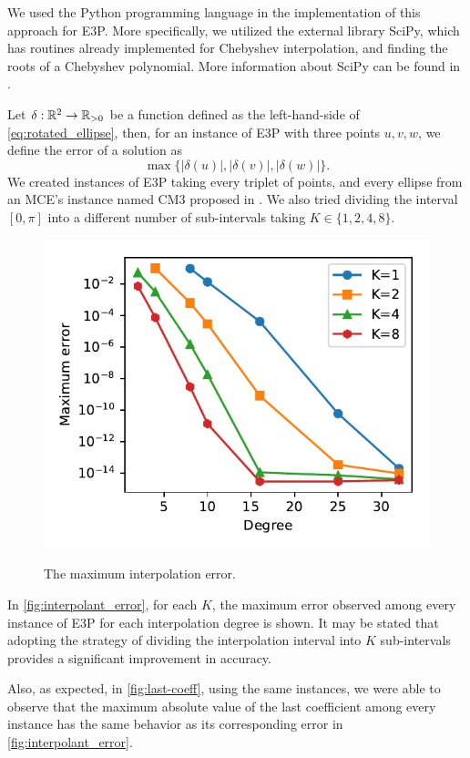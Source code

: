 We used the Python programming language in the implementation of this approach for E3P. More specifically, we utilized the external library SciPy, which has routines already implemented for Chebyshev interpolation, and finding the roots of a Chebyshev polynomial. More information about SciPy can be found in \cite{scipy}.
 
Let $\delta : \mathbb{R}^2 \to \mathbb{R}_{>0}$ be a function defined as the left-hand-side of \autoref{eq:rotated_ellipse}, then, for an instance of E3P with three points $u, v, w$, we define the error of a solution as $$\max\{|\delta(u)|, |\delta(v)|, |\delta(w)| \}.$$
We created instances of E3P taking every triplet of points, and every ellipse from an MCE's instance named CM3 proposed in . We also tried dividing the interval $[0, \pi]$ into a different number of sub-intervals taking $K \in\{1, 2, 4, 8\}$.

\begin{figure}
	\centering
	\caption{The maximum interpolation error.}
	\includegraphics[scale=.9]{tex/figures/error_roots}
	\fautor
	\label{fig:interpolant_error}
\end{figure}

In \autoref{fig:interpolant_error}, for each $K$, the maximum error observed among every instance of E3P for each interpolation degree is shown. It may be stated that adopting the strategy of dividing the interpolation interval into $K$ sub-intervals provides a significant improvement in accuracy.

Also, as expected, in \autoref{fig:last-coeff}, using the same instances, we were able to observe that the maximum absolute value of the last coefficient among every instance has the same behavior as its corresponding error in \autoref{fig:interpolant_error}.

